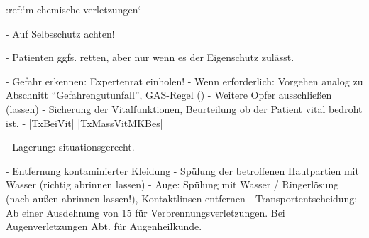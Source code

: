 :ref:`m-chemische-verletzungen`
\begin{enumerate}
  -   Auf Selbsschutz achten!
  \begin{itemize}
    -   Patienten ggfs. retten, aber nur wenn es der
    Eigenschutz zulässt.
  \end{itemize}
  -   Gefahr erkennen:   Expertenrat einholen!
  -   Wenn erforderlich: Vorgehen analog zu Abschnitt
  \enquote{Gefahrengutunfall}, GAS-Regel
  ()
  -   Weitere Opfer ausschließen (lassen)
  -   Sicherung der Vitalfunktionen, Beurteilung ob der
  Patient vital bedroht ist.
  -   |TxBeiVit| |TxMassVitMKBes|
  \begin{itemize}
    -   Lagerung: situationsgerecht.
  \end{itemize}
  -   Entfernung kontaminierter Kleidung
  -   Spülung der betroffenen Hautpartien mit Wasser  (richtig abrinnen
  lassen)
  -   Auge: Spülung mit Wasser / Ringerlösung (nach außen abrinnen
  lassen!),  Kontaktlinsen entfernen
  -   Transportentscheidung: Ab einer Ausdehnung von
  15%
  für Verbrennungsverletzungen. Bei Augenverletzungen Abt.
  für Augenheilkunde.
\end{enumerate}